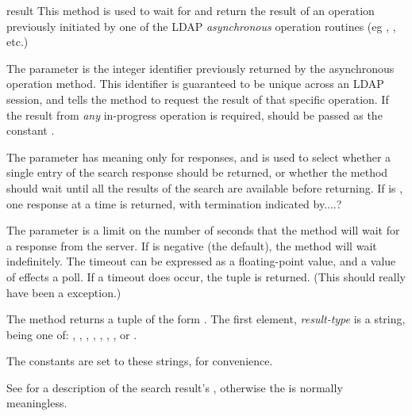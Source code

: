 
\begin{methoddesc}[tuple]{result}{}
This method is used to wait for and return the result of an operation
previously initiated by one of the LDAP \emph{asynchronous} operation routines
(eg , , etc.) 

The  parameter is the integer identifier previously returned by the
asynchronous operation method. 
This identifier is guaranteed to be unique across an LDAP session,
and tells the  method to request the result of that
specific operation.
If the result from \emph{any} in-progress operation is required, 
 should be passed as the constant .

The 
parameter has meaning only for  responses, and is used to select 
whether a single entry of the search response should be returned, or whether
the  method should wait until all the results of the search 
are available before returning. 
If  is , one response at a time is returned, with 
termination indicated by....?

The  parameter is a limit on the number of seconds that the
method will wait for a response from the server. 
If  is negative (the default), the method will wait indefinitely.
The timeout can be expressed as a floating-point value, and
a value of  effects a poll.
If a timeout does occur, the tuple  is returned.
(This should really have been a  exception.)

The  method returns a tuple of the form 
.
The first element, \textit{result-type} is a string, being one of:
, ,
, 
, , , 
, or .

The constants  are set to these strings, for convenience.

See  for a description of the search result's ,
otherwise the  is normally meaningless.

\end{methoddesc}

